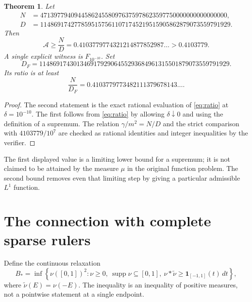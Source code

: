 \documentclass[11pt,a4paper]{article}
\newtheorem{theorem}{Theorem}
\theoremstyle{remark}\newtheorem{remark}[theorem]{Remark}
\newcommand{\ind}{\mathbf 1}
\begin{document}
\begin{theorem}\label{thm:main}
Let
\begin{align*}
 N&=4713977940944586245580976375978623597750000000000000000,\\
 D&=11486917427785951575611071745219515905862879073559791929.
\end{align*}
Then
\[
 \mathcal A\ge \frac ND
 =0.4103779774321214877852987\ldots>0.4103779.
\]
A single explicit witness is $F_{10^{-10}}$. Set
\[
 D_F=11486917430134691792906455293684961315501879073559791929.
\]
Its ratio is at least
\[
 \frac{N}{D_F}=0.4103779773482111379678143\ldots.
\]
\end{theorem}
\begin{proof}
The second statement is the exact rational evaluation of \eqref{eq:ratio} at $\delta=10^{-10}$. The first follows from \eqref{eq:ratio} by allowing $\delta\downarrow0$ and using the definition of a supremum. The relation $\gamma/m^2=N/D$ and the strict comparison with $4103779/10^7$ are checked as rational identities and integer inequalities by the verifier.
\end{proof}

The first displayed value is a limiting lower bound for a supremum; it is not claimed to be attained by the measure $\mu$ in the original function problem. The second bound removes even that limiting step by giving a particular admissible $L^1$ function.

\section{The connection with complete sparse rulers}
Define the continuous relaxation
\begin{equation}\label{eq:relax}
 B_* =\inf\left\{\nu([0,1])^2:
 \nu\ge0,\ \operatorname{supp}\nu\subseteq[0,1],\
 \nu*\widetilde\nu\ge\ind_{[-1,1]}(t)\,dt\right\},
\end{equation}
where $\widetilde\nu(E)=\nu(-E)$. The inequality is an inequality of positive measures, not a pointwise statement at a single endpoint.
\end{document}
